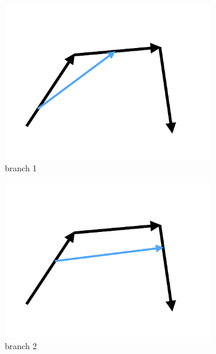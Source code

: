 \documentclass[12pt]{article}
\begin{document}
\begin{mySection}[Algorithm]
\begin{figure}
	\centering
	\vskip -0cm 
	\begin{subfigure}{0.3\linewidth}
  		\includegraphics[width=1.0\linewidth]{Flowchart_branch1.pdf}
  		\caption{branch 1}
  		\label{fig:branch1}
  	\end{subfigure}
  	\begin{subfigure}{0.3\linewidth}
  		\includegraphics[width=1.0\linewidth]{Flowchart_branch2.pdf}
  		\caption{branch 2}
  		\label{fig:branch2}
  	\end{subfigure}
  	\begin{subfigure}{0.3\linewidth}

\end{subfigure}
\end{figure}
\end{mySection}
\end{document}
